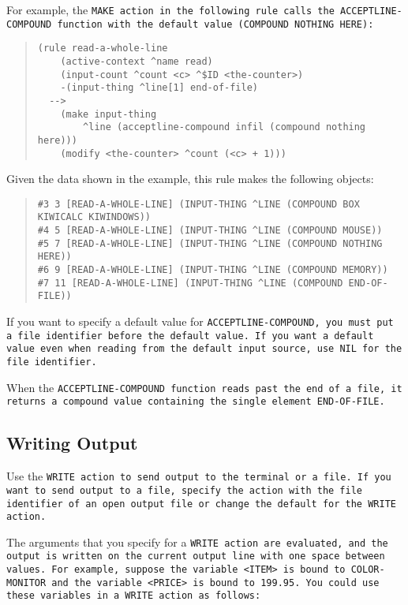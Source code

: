 For example, the \tt{MAKE} action in the following rule calls the
\tt{ACCEPTLINE-COMPOUND} function with the default value
\verb|(COMPOUND NOTHING HERE)|:

\begin{quote}
\begin{verbatim}
(rule read-a-whole-line
    (active-context ^name read)
    (input-count ^count <c> ^$ID <the-counter>)
    -(input-thing ^line[1] end-of-file)
  -->
    (make input-thing
        ^line (acceptline-compound infil (compound nothing here)))
    (modify <the-counter> ^count (<c> + 1)))
\end{verbatim}
\end{quote}

Given the data shown in the example, this rule
makes the following objects:

\begin{quote}
\begin{verbatim}
#3 3 [READ-A-WHOLE-LINE] (INPUT-THING ^LINE (COMPOUND BOX KIWICALC KIWINDOWS))
#4 5 [READ-A-WHOLE-LINE] (INPUT-THING ^LINE (COMPOUND MOUSE))
#5 7 [READ-A-WHOLE-LINE] (INPUT-THING ^LINE (COMPOUND NOTHING HERE))
#6 9 [READ-A-WHOLE-LINE] (INPUT-THING ^LINE (COMPOUND MEMORY))
#7 11 [READ-A-WHOLE-LINE] (INPUT-THING ^LINE (COMPOUND END-OF-FILE))
\end{verbatim}
\end{quote}

If you want to specify a default value for \tt{ACCEPTLINE-COMPOUND},
you must put a file identifier before the default value. If you want a
default value even when reading from the default input source, use
\tt{NIL} for the file identifier.

When the \tt{ACCEPTLINE-COMPOUND} function reads past the end of a
file, it returns a compound value containing the single element
\tt{END-OF-FILE}.

\subsection{Writing Output}

Use the \tt{WRITE} action to send output to the terminal or a file. If
you want to send output to a file, specify the action with the file
identifier of an open output file or change the default for the
\tt{WRITE} action.

The arguments that you specify for a \tt{WRITE} action are evaluated,
and the output is written on the current output line with one space
between values. For example, suppose the variable \verb|<ITEM>| is bound to
\tt{COLOR-MONITOR} and the variable \verb|<PRICE>| is bound to 199.95. You
could use these variables in a \tt{WRITE} action as follows:

